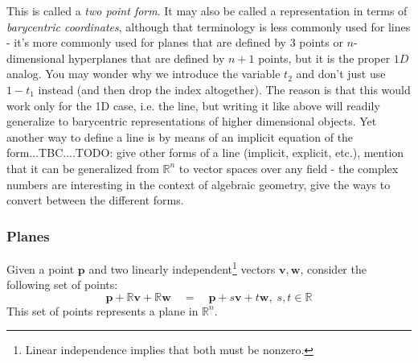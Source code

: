 This is called a \emph{two point form}. It may also be called a representation in terms of \emph{barycentric coordinates}, although that terminology is less commonly used for lines - it's more commonly used for planes that are defined by 3 points or $n$-dimensional hyperplanes that are defined by $n+1$ points, but it is the proper $1D$ analog. You may wonder why we introduce the variable $t_2$ and don't just use $1 - t_1$ instead (and then drop the index altogether). The reason is that this would work only for the 1D case, i.e. the line, but writing it like above will readily generalize to barycentric representations of higher dimensional objects. Yet another way to define a line is by means of an implicit equation of the form...TBC....TODO: give other forms of a line (implicit, explicit, etc.), mention that it can be generalized from $\mathbb{R}^n$ to vector spaces over any field - the complex numbers are interesting in the context of algebraic geometry, give the ways to convert between the different forms.




\subsubsection{Planes}
Given a point $\mathbf{p}$ and two linearly independent\footnote{Linear independence implies that both must be nonzero.} vectors $\mathbf{v, w}$, consider the following set of points:
\begin{equation}
 \mathbf{p} + \mathbb{R} \mathbf{v}  + \mathbb{R} \mathbf{w}
 \quad = \quad
 \mathbf{p} + s \mathbf{v} + t \mathbf{w}, \; s,t \in \mathbb{R}
\end{equation}
This set of points represents a plane in $\mathbb{R}^n$. 

